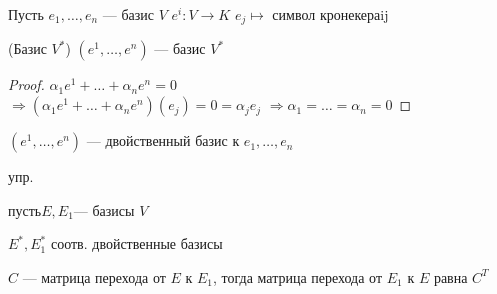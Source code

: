 \begin{conj}
    Пусть $e_1, \dots, e_n$ --- базис $V$
    $e^i : V \to K$
        $e_j \mapsto$ символ кронекера{ij}
\end{conj}

\begin{theorem}(Базис $V^*$)
    $(e^1, \dots, e^n)$ --- базис $V^*$

    \begin{proof}
    \emptyln
    $\alpha_1 e^1 + \dots + \alpha_n e^n = 0$ \\
    $\Longrightarrow (\alpha_1 e^1 + \dots + \alpha_n e^n) (e_j) = 0 = \alpha_j e_j$
    $\Longrightarrow \alpha_1 = \dots = \alpha_n = 0$
    \end{proof}
\end{theorem}

\begin{conj}
    $(e^1, \dots, e^n)$ --- двойственный базис к $e_1, \dots, e_n$
\end{conj}

упр.

пусть$ E, E_1$--- базисы $V$

$E^*, E^*_1$ соотв. двойственные базисы

$C$ --- матрица перехода от $E$ к $E_1$, тогда матрица перехода от $E_1$ к $E$ равна $C^T$

